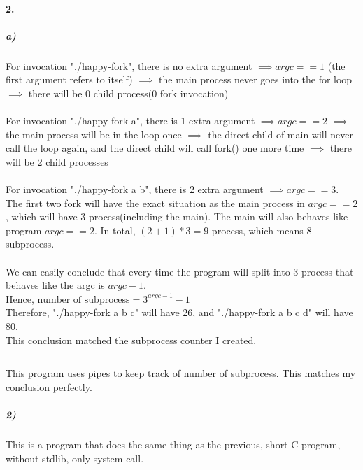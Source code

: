 \documentclass{article}
\begin{document}
\paragraph{2.}
\subparagraph{a)}
For invocation "./happy-fork", there is no extra argument
$\implies argc == 1$ (the first argument refers to itself)
$\implies$ the main process never goes into the for loop
$\implies$ there will be 0 child process(0 fork invocation) \\
\\
For invocation "./happy-fork a", there is 1 extra argument
$\implies argc == 2$
$\implies$ the main process will be in the loop once
$\implies$ the direct child of main will never call the loop again,
and the direct child will call fork() one more time
$\implies$ there will be 2 child processes\\
\\
For invocation "./happy-fork a b", there is 2 extra argument
$\implies argc == 3$.
The first two fork will have the exact situation as the main process in $argc == 2$, which will have 3 process(including the main).
The main will also behaves like program $argc == 2$.
In total, $(2 + 1) * 3 = 9$ process, which means 8 subprocess. \\
\\
We can easily conclude that every time the program will split into 3 process that behaves like the argc is $argc - 1$. \\
Hence, $ \text{number of subprocess} = 3^{argc - 1} - 1$ \\
Therefore, "./happy-fork a b c" will have 26, and "./happy-fork a b c d" will have 80. \\

This conclusion matched the subprocess counter I created.
\inputminted{c}{code.c}

This program uses pipes to keep track of number of subprocess.
This matches my conclusion perfectly.
\subparagraph{2)}
This is a program that does the same thing as the previous, short C program, without stdlib, only system call.
\inputminted{asm}{l.s}
\end{document}
